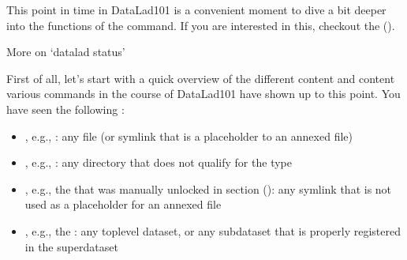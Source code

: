 \sphinxAtStartPar
This point in time in DataLad\sphinxhyphen{}101 is a convenient moment to dive a bit deeper
into the functions of the  command. If you are
interested in this, checkout the {\hyperref[\detokenize{basics/101-132-advancednesting:fom-status}]{}} ().

\ignorespaces \begin{findoutmore}[label={fom-status}, before title={\thetcbcounter\ }, float, check odd page=true]{More on ‘datalad status’}
\label{\detokenize{basics/101-132-advancednesting:fom-status}}

\sphinxAtStartPar
First of all, let’s start with a quick overview of the different content 
and content  various  commands in the course
of DataLad\sphinxhyphen{}101 have shown up to this point.
You have seen the following :
\begin{itemize}
\item {} 
\sphinxAtStartPar
{}, e.g., : any file (or symlink that is a placeholder to an annexed file)

\item {} 
\sphinxAtStartPar
{}, e.g., : any directory that does not qualify for the  type

\item {} 
\sphinxAtStartPar
{}, e.g., the  that was manually unlocked in section {\hyperref[\detokenize{basics/101-110-run2:run3}]{}} ():
any symlink that is not used as a placeholder for an annexed file

\item {} 
\sphinxAtStartPar
{}, e.g., the : any top\sphinxhyphen{}level dataset, or any subdataset
that is properly registered in the superdataset


\end{itemize}
\end{findoutmore}
